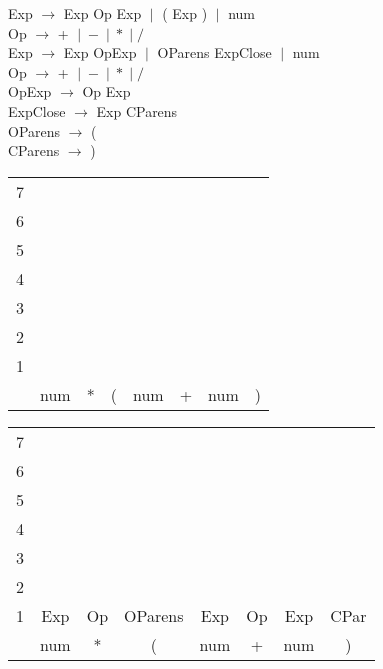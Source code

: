 \documentclass[fleqn]{article}
\begin{document}
\noindent Exp $\rightarrow $ Exp Op Exp $\; | \;$ ( Exp ) $ \; | \;$ num \\
Op $\rightarrow $ + $\; | \; - \; | \; * \; | \; / $ \\

\noindent 
Exp $\rightarrow $ Exp OpExp $\; | \; $ OParens ExpClose $\; | \; $ num \\
Op $\rightarrow $ + $\; | \; - \; | \; * \; | \; / $ \\
OpExp $\rightarrow $ Op Exp \\
ExpClose $\rightarrow $ Exp CParens \\
OParens $\rightarrow $ (\\
CParens $\rightarrow $ )\\



\begin{tabular}{r | c | c | c | c  | c | c | c|}
\cline{2-2}
7 &\\\cline{2-3}
6 && \\\cline{2-4}
5 && & \\\cline{2-5}
4 && & & \\\cline{2-6}
3 && & & & \\\cline{2-7}
2 && & & & & \\\cline{2-8}
1 & & & & & & & \\\cline{2-8}
& num & * & ( & num & + & num & ) \\\cline{2-8}
\cline {2-8}

\end{tabular}

\vspace{0.5in}


\begin{tabular}{r | c | c | c | c  | c | c | c|}
\cline{2-2}
7 &\\\cline{2-3}
6 && \\\cline{2-4}
5 && & \\\cline{2-5}
4 && & & \\\cline{2-6}
3 && & & & \\\cline{2-7}
2 && & & & & \\\cline{2-8}
1 & Exp & Op & OParens & Exp & Op & Exp & CPar \\\cline{2-8}
& num & * & ( & num & + & num & ) \\\cline{2-8}
\cline {2-8}

\end{tabular}

\vspace{0.5in}
\end{document}
